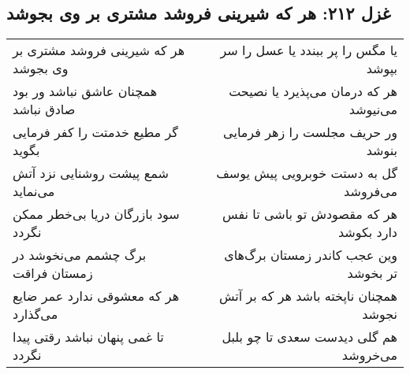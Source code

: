 \begin{center}
\section*{غزل ۲۱۲: هر که شیرینی فروشد مشتری بر وی بجوشد}
\label{sec:212}
\begin{longtable}{l p{0.5cm} r}
هر که شیرینی فروشد مشتری بر وی بجوشد
&&
یا مگس را پر ببندد یا عسل را سر بپوشد
\\
همچنان عاشق نباشد ور بود صادق نباشد
&&
هر که درمان می‌پذیرد یا نصیحت می‌نیوشد
\\
گر مطیع خدمتت را کفر فرمایی بگوید
&&
ور حریف مجلست را زهر فرمایی بنوشد
\\
شمع پیشت روشنایی نزد آتش می‌نماید
&&
گل به دستت خوبرویی پیش یوسف می‌فروشد
\\
سود بازرگان دریا بی‌خطر ممکن نگردد
&&
هر که مقصودش تو باشی تا نفس دارد بکوشد
\\
برگ چشمم می‌نخوشد در زمستان فراقت
&&
وین عجب کاندر زمستان برگ‌های تر بخوشد
\\
هر که معشوقی ندارد عمر ضایع می‌گذارد
&&
همچنان ناپخته باشد هر که بر آتش نجوشد
\\
تا غمی پنهان نباشد رقتی پیدا نگردد
&&
هم گلی دیدست سعدی تا چو بلبل می‌خروشد
\\
\end{longtable}
\end{center}
